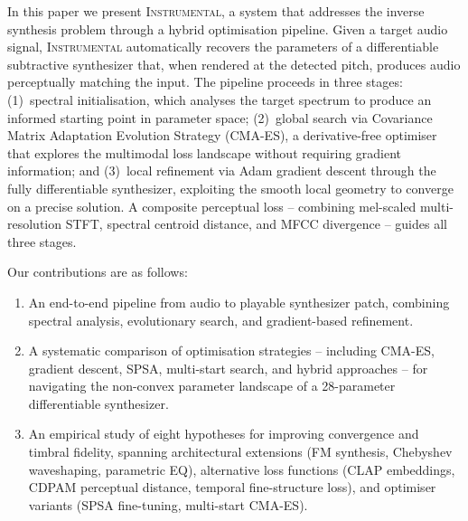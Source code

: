 In this paper we present \textsc{Instrumental}, a system that addresses the inverse synthesis problem through a hybrid optimisation pipeline. Given a target audio signal, \textsc{Instrumental} automatically recovers the parameters of a differentiable subtractive synthesizer that, when rendered at the detected pitch, produces audio perceptually matching the input. The pipeline proceeds in three stages: (1)~spectral initialisation, which analyses the target spectrum to produce an informed starting point in parameter space; (2)~global search via Covariance Matrix Adaptation Evolution Strategy (CMA-ES), a derivative-free optimiser that explores the multimodal loss landscape without requiring gradient information; and (3)~local refinement via Adam gradient descent through the fully differentiable synthesizer, exploiting the smooth local geometry to converge on a precise solution. A composite perceptual loss -- combining mel-scaled multi-resolution STFT, spectral centroid distance, and MFCC divergence -- guides all three stages.

Our contributions are as follows:
\begin{enumerate}
    \item An end-to-end pipeline from audio to playable synthesizer patch, combining spectral analysis, evolutionary search, and gradient-based refinement.
    \item A systematic comparison of optimisation strategies -- including CMA-ES, gradient descent, SPSA, multi-start search, and hybrid approaches -- for navigating the non-convex parameter landscape of a 28-parameter differentiable synthesizer.
    \item An empirical study of eight hypotheses for improving convergence and timbral fidelity, spanning architectural extensions (FM synthesis, Chebyshev waveshaping, parametric EQ), alternative loss functions (CLAP embeddings, CDPAM perceptual distance, temporal fine-structure loss), and optimiser variants (SPSA fine-tuning, multi-start CMA-ES).
\end{enumerate}
